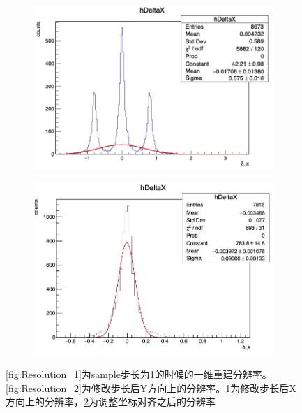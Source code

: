 \begin{figure}[htb]
    \begin{subfigure}[b]{0.24\textwidth}
        \centering
        \includegraphics[width=\textwidth,clip]{figures/Chapter3/Resolution_3.png}
        \caption{}
        \label{fig:Resolution_3}
    \end{subfigure}
    \begin{subfigure}[b]{0.24\textwidth}
        \centering
        \includegraphics[width=\textwidth,clip]{figures/Chapter3/Resolution_4.png}
        \caption{}
        \label{fig:Resolution_4}
    \end{subfigure}
    \caption[Cluster finder 重建分辨率]{\ref{fig:Resolution_1}为sample步长为1的时候的一维重建分辨率。\ref{fig:Resolution_2}为修改步长后Y方向上的分辨率。\ref{fig:Resolution_3}为修改步长后X方向上的分辨率，\ref{fig:Resolution_4}为调整坐标对齐之后的分辨率}
       \label{fig:Ghost_Hit_plots}
\end{figure}

